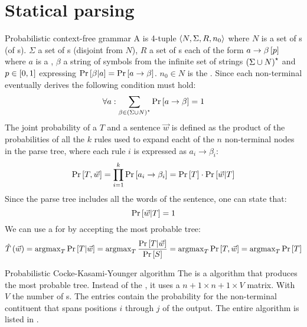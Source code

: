 \section{Statical parsing}
\begin{df}{Probabilistic context-free grammar}
A \sb{} is 4-tuple $\left\langle N,\Sigma,R,n_0\right\rangle$ where $N$ is a set of s (of s). $\Sigma$ a set of s (disjoint from $N$), $R$ a set of s each of the form $a\rightarrow\beta\left[p\right]$ where $a$ is a , $\beta$ a string of symbols from the infinite set of strings $\left(\Sigma\cup N\right)^{\star}$ and $p\in\left[0,1\right]$ expressing $\Pr\left[\beta|a\right]=\Pr\left[a\rightarrow\beta\right]$. $n_0\in N$ is the . Since each non-terminal eventually derives the following condition must hold:
\begin{equation}
\forall a:\displaystyle\sum_{\beta\in\left(\Sigma\cup N\right)^{\star}}\Pr\left[a\rightarrow\beta\right]=1
\end{equation}
The joint probability of a  $T$ and a sentence $\vec{w}$ is defined as the product of the probabilities of all the $k$ rules used to expand eacht of the $n$ non-terminal nodes in the parse tree, where each rule $i$ is expressed as $a_i\rightarrow\beta_i$:
\begin{equation}
\Pr\left[T,\vec{w}\right]=\displaystyle\prod_{i=1}^{k}{\Pr\left[a_i\rightarrow\beta_i\right]}=\Pr\left[T\right]\cdot\Pr\left[\vec{w}|T\right]
\end{equation}
Since the parse tree includes all the words of the sentence, one can state that:
\begin{equation}
\Pr\left[\vec{w}|T\right]=1
\end{equation}
We can use a \sb{} for  by accepting the most probable tree:
\begin{equation}
\hat{T}\left(\vec{w}\right)=\operatorname{argmax}_T\Pr\left[T|\vec{w}\right]=\operatorname{argmax}_T\displaystyle\frac{\Pr\left[T|\vec{w}\right]}{\Pr\left[S\right]}=\operatorname{argmax}_T\Pr\left[T,\vec{w}\right]=\operatorname{argmax}_T\Pr\left[T\right]
\end{equation}
\end{df}
\begin{df}[PCKY]{Probabilistic Cocke-Kasami-Younger algorithm}
The\sb{} is a  algorithm that produces the most probable tree. Instead of the , it uses a $n+1\times n+1\times V$ matrix. With $V$ the number of s. The entries contain the probability for the non-terminal contituent that spans positions $i$ through $j$ of the output. The entire algorithm is listed in .
\end{df}
